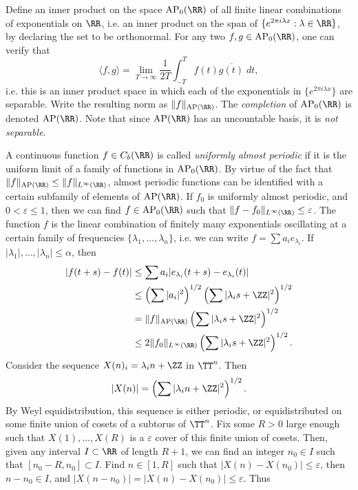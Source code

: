 \begin{example}
    Define an inner product on the space $\text{AP}_0(\RR)$ of all finite linear combinations of exponentials on $\RR$, i.e. an inner product on the span of $\{ e^{2 \pi i \lambda x} : \lambda \in \RR \}$, by declaring the set to be orthonormal. For any two $f,g \in \text{AP}_0(\RR)$, one can verify that
    \[ \langle f,g \rangle = \lim_{T \to \infty} \frac{1}{2T} \int_{-T}^T f(t) \overline{g(t)}\; dt, \]
    i.e. this is an inner product space in which each of the exponentials in $\{ e^{2 \pi i \lambda x} \}$ are separable. Write the resulting norm as $\| f \|_{\text{AP}(\RR)}$. The \emph{completion} of $\text{AP}_0(\RR)$ is denoted $\text{AP}(\RR)$. Note that since $\text{AP}(\RR)$ has an uncountable basis, it is \emph{not separable}.

    A continuous function $f \in C_b(\RR)$ is called \emph{uniformly almost periodic} if it is the uniform limit of a family of functions in $\text{AP}_0(\RR)$. By virtue of the fact that $\| f \|_{\text{AP}(\RR)} \leq \| f \|_{L^\infty(\RR)}$, almost periodic functions can be identified with a certain subfamily of elements of $\text{AP}(\RR)$. If $f_0$ is uniformly almost periodic, and $0 < \varepsilon \leq 1$, then we can find $f \in \text{AP}_0(\RR)$ such that $\| f - f_0 \|_{L^\infty(\RR)} \leq \varepsilon$. The function $f$ is the linear combination of finitely many exponentials oscillating at a certain family of frequencies $\{ \lambda_1,\dots,\lambda_n \}$, i.e. we can write $f = \sum a_i e_{\lambda_i}$. If $|\lambda_1|, \dots, |\lambda_n| \leq \alpha$, then
    \begin{align*}
        |f(t + s) - f(t)| &\leq \sum a_i |e_{\lambda_i}(t+s) - e_{\lambda_i}(t)|\\
        &\leq \left( \sum |a_i|^2 \right)^{1/2} \left( \sum |\lambda_i s + \ZZ|^2 \right)^{1/2}\\
        &= \| f \|_{\text{AP}(\RR)} \left( \sum |\lambda_i s + \ZZ|^2 \right)^{1/2}\\
        &\leq 2 \| f_0 \|_{L^\infty(\RR)} \left( \sum |\lambda_i s + \ZZ|^2 \right)^{1/2}.
    \end{align*}
    Consider the sequence $X(n)_i = \lambda_i n + \ZZ$ in $\TT^n$. Then
    \[ |X(n)| = \left( \sum |\lambda_i n + \ZZ|^2 \right)^{1/2}. \]
    By Weyl equidistribution, this sequence is either periodic, or equidistributed on some finite union of cosets of a subtorus of $\TT^n$. Fix some $R > 0$ large enough such that $X(1), \dots, X(R)$ is a $\varepsilon$ cover of this finite union of cosets. Then, given any interval $I \subset \RR$ of length $R+1$, we can find an integer $n_0 \in I$ such that $[n_0 - R, n_0] \subset I$. Find $n \in [1,R]$ such that $|X(n) - X(n_0)| \leq \varepsilon$, then $n - n_0 \in I$, and $|X(n - n_0)| = |X(n) - X(n_0)| \leq \varepsilon$. Thus

\end{example}
